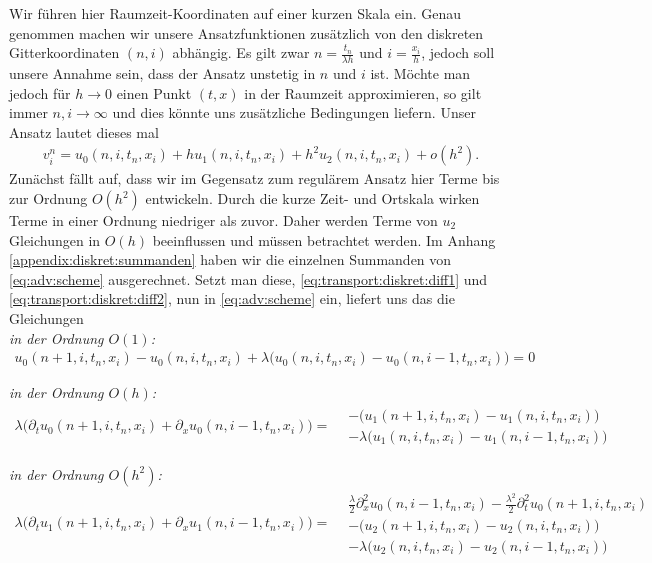 Wir führen hier Raumzeit-Koordinaten auf einer kurzen Skala ein.
Genau genommen machen wir unsere Ansatzfunktionen zusätzlich von den diskreten Gitterkoordinaten $(n,i)$ abhängig.
Es gilt zwar $n = \frac {t_n} {\lambda h}$ und $i = \frac {x_i}{h}$, jedoch soll unsere Annahme sein, dass der Ansatz unstetig in $n$ und $i$ ist.
Möchte man jedoch für $h \to 0$ einen Punkt $(t,x)$ in der Raumzeit approximieren, so gilt immer $n,i \to \infty$ und dies könnte uns zusätzliche Bedingungen liefern.
Unser Ansatz lautet dieses mal
\begin{align}\label{eq:transport:diskret:ansatz}
v^n_i = u_0(n, i, t_n, x_i) + h u_1(n, i, t_n, x_i) + h^2 u_2(n, i, t_n, x_i) + o(h^2).
\end{align}
Zunächst fällt auf, dass wir im Gegensatz zum regulärem Ansatz hier Terme bis zur Ordnung $O(h^2)$ entwickeln.
Durch die kurze Zeit- und Ortskala wirken Terme in einer Ordnung niedriger als zuvor.
Daher werden Terme von $u_2$ Gleichungen in $O(h)$ beeinflussen und müssen betrachtet werden.
Im Anhang \ref{appendix:diskret:summanden} haben wir die einzelnen Summanden von \eqref{eq:adv:scheme} ausgerechnet.
Setzt man diese, \eqref{eq:transport:diskret:diff1} und \eqref{eq:transport:diskret:diff2}, nun in \eqref{eq:adv:scheme} ein, liefert uns das die Gleichungen
\\

\noindent \emph{in der Ordnung $O(1)$:}
\begin{align}\label{eq:transport:diskret:o1}
u_0(n+1, i, t_n, x_i) - u_0(n, i, t_n, x_i)
+ \lambda \bigl(u_0(n, i, t_n, x_i) - u_0(n, i-1, t_n, x_i) \bigr) = 0
\end{align}

\noindent \emph{in der Ordnung $O(h)$:}
\begin{align}\label{eq:transport:diskret:oh}
\lambda \bigl( \partial_t u_0(n+1, i, t_n, x_i) + \partial_x u_0(n, i-1, t_n, x_i) \bigr) =
\begin{split}
&- \bigl( u_1(n+1, i, t_n, x_i) - u_1(n, i, t_n, x_i) \bigr)\\
&- \lambda \bigl(u_1(n, i, t_n, x_i) - u_1(n, i-1, t_n, x_i) \bigr)
\end{split}
\end{align}

\noindent \emph{in der Ordnung $O(h^2)$:}
\begin{align}\label{eq:transport:diskret:oh2}
\lambda \bigl( \partial_t u_1(n+1, i, t_n, x_i) + \partial_x u_1(n, i-1, t_n, x_i) \bigr) =
\begin{split}
&\frac {\lambda}{2} \partial^2_x u_0(n, i-1, t_n, x_i) - \frac{\lambda^2}{2} \partial^2_t u_0(n+1, i, t_n, x_i)\\
&- \bigl( u_2(n+1, i, t_n, x_i) - u_2(n, i, t_n, x_i) \bigr)\\
&- \lambda \bigl(u_2(n, i, t_n, x_i) - u_2(n, i-1, t_n, x_i) \bigr)
\end{split}
\end{align}

